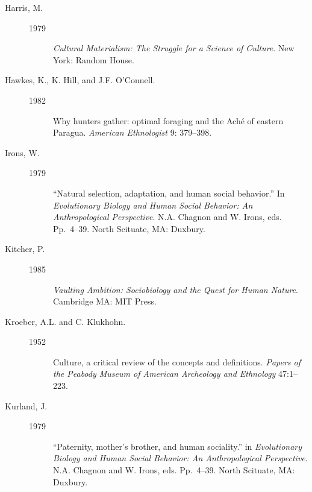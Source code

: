 \documentclass[11pt]{article}
\begin{document}
\begin{description}
\item[Harris, M.]
\mbox{}\begin{description}
\item[1979] \emph{Cultural Materialism: The Struggle for a
Science of Culture}.  New York: Random House. 
\end{description}

\item[Hawkes, K., K. Hill, and J.F. O'Connell.]
\mbox{}\begin{description}
\item[1982] Why hunters
gather: optimal foraging and the Ach\'{e} of eastern Paragua. {\em
American Ethnologist} 9: 379--398.  
\end{description}

\item[Irons, W.]
\mbox{}\begin{description}
\item[1979] ``Natural selection, adaptation, and human social
behavior.'' In \emph{Evolutionary Biology and Human Social Behavior: An
Anthropological Perspective}. N.A. Chagnon and W. Irons, eds.
Pp.~4--39. North Scituate, MA: Duxbury.
\end{description}

\item[Kitcher, P.]
\mbox{}\begin{description}
\item[1985] \emph{Vaulting Ambition: Sociobiology and the Quest
for Human Nature}.  Cambridge MA: MIT Press.  
\end{description}

\item[Kroeber, A.L. and C. Klukhohn.]
\mbox{}\begin{description}
\item[1952] Culture, a critical review of
the concepts and definitions. \emph{Papers of the Peabody Museum of
American Archeology and Ethnology} 47:1--223.  
\end{description}

\item[Kurland, J.]
\mbox{}\begin{description}
\item[1979] ``Paternity, mother's brother, and human
sociality.'' in \emph{Evolutionary Biology and Human Social Behavior: An
Anthropological Perspective}. N.A. Chagnon and W. Irons, eds.
Pp.~4--39. North Scituate, MA: Duxbury.
\end{description}


\end{description}
\end{document}
